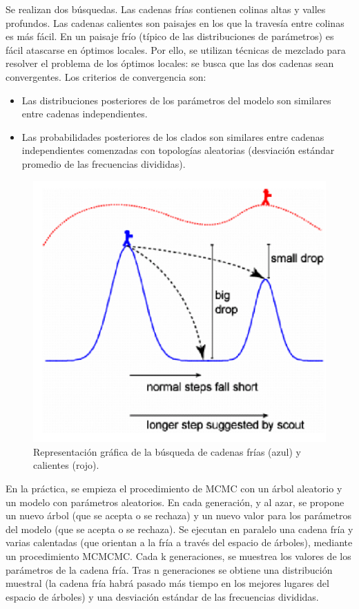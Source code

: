 Se realizan dos búsquedas. Las cadenas frías contienen colinas altas y valles profundos. Las cadenas calientes son paisajes en los que la travesía entre colinas es más fácil. En un paisaje frío (típico de las distribuciones de parámetros) es fácil atascarse en óptimos locales. Por ello, se utilizan técnicas de mezclado para resolver el problema de los óptimos locales: se busca que las dos cadenas sean convergentes. Los criterios de convergencia son: 
\begin{itemize}
\item Las distribuciones posteriores de los parámetros del modelo son similares entre cadenas independientes.
\item Las probabilidades posteriores de los clados son similares entre cadenas independientes comenzadas con topologías aleatorias (desviación estándar promedio de las frecuencias divididas).
\end{itemize}

\begin{figure}[htbp]
\centering
\includegraphics[width=0.5\linewidth]{figs/cadenas-frias-calientes.png}
\caption{Representación gráfica de la búsqueda de cadenas frías (azul) y calientes (rojo).}
\end{figure}

En la práctica, se empieza el procedimiento de MCMC con un árbol aleatorio y un modelo con parámetros aleatorios. En cada generación, y al azar, se propone un nuevo árbol (que se acepta o se rechaza) y un nuevo valor para los parámetros del modelo (que se acepta o se rechaza). Se ejecutan en paralelo una cadena fría y varias calentadas (que orientan a la fría a través del espacio de árboles), mediante un procedimiento MCMCMC. Cada k generaciones, se muestrea los valores de los parámetros de la cadena fría. Tras n generaciones se obtiene una distribución muestral (la cadena fría habrá pasado más tiempo en los mejores lugares del espacio de árboles) y una desviación estándar de las frecuencias divididas.

